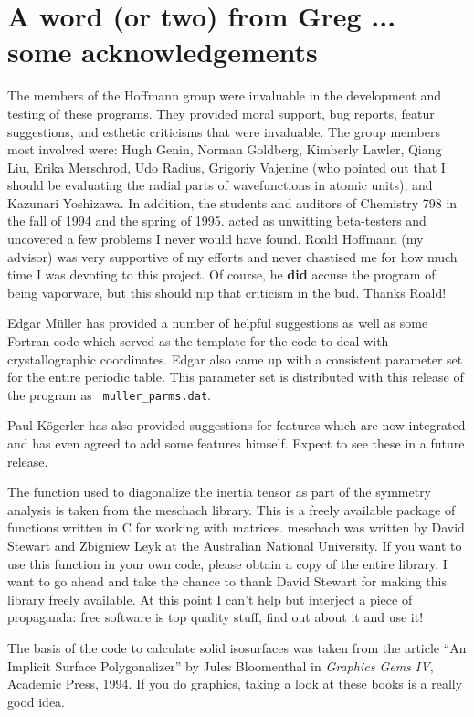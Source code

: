 \chapter{A word (or two) from Greg ... some acknowledgements}

The members of the Hoffmann group were invaluable in the development
and testing of these programs.  They provided moral support, bug
reports, featur suggestions, and esthetic criticisms that were
invaluable.  The group 
members most involved were: Hugh Genin,  Norman Goldberg, Kimberly
Lawler, Qiang Liu,  Erika Merschrod, Udo Radius, Grigoriy Vajenine
(who pointed out  
that I should be evaluating the radial parts of wavefunctions in
atomic units), and Kazunari
Yoshizawa.  In addition, the students and auditors of Chemistry 798 in
the fall of 1994 and the spring of 1995. acted as unwitting
beta-testers and uncovered a few   
problems I never would have found.  Roald Hoffmann (my advisor) was
very supportive of my efforts and never chastised me for how much
time I was devoting to this project.  Of course, he {\bf did} accuse
the program of being vaporware, but this should nip that criticism in
the bud.  Thanks Roald!   

Edgar M\"{u}ller has provided a number of helpful suggestions as well
as some Fortran code which served as the template for the
code to deal with crystallographic coordinates.  Edgar also came up
with a consistent parameter set for the entire periodic table.  This 
parameter set is distributed with this release of the program as {\tt
muller\_parms.dat}.

Paul K\"{o}gerler has also provided suggestions for features which are
now integrated and has even agreed to add some features himself.
Expect to see these in a future release.

The function used to diagonalize the inertia tensor as part of the
symmetry analysis is taken from the {\sf meschach} library.  This is a
freely available package of functions written in C for working with
matrices. {\sf meschach} was written by David Stewart and Zbigniew Leyk
at the Australian National University.  If you want to use this
function in your own code, please obtain a copy of the entire library.
I want to go ahead and 
take the chance to thank David Stewart for making this library freely
available.  At this point I can't help but interject a piece of 
propaganda: free software is top quality stuff, find out about it and
use it! 

The basis of the code to calculate solid isosurfaces was taken from
the article ``An Implicit Surface Polygonalizer'' by Jules Bloomenthal
in {\em Graphics Gems IV}, Academic Press, 1994.  If you do graphics,
taking a look at these books is a really good idea.  

